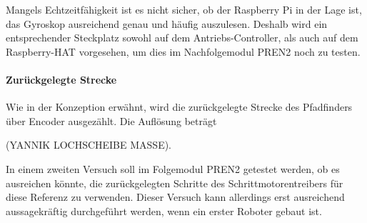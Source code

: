 \documentclass[main.tex]{subfiles} %
\begin{document}
Mangels Echtzeitfähigkeit ist es nicht sicher, ob der Raspberry Pi in der Lage
ist, das Gyroskop ausreichend genau und häufig auszulesen. Deshalb wird ein
entsprechender Steckplatz sowohl auf dem Antriebs-Controller, als auch auf dem
Raspberry-HAT vorgesehen, um dies im Nachfolgemodul PREN2 noch zu testen.

\paragraph{Zurückgelegte Strecke}
Wie in der Konzeption erwähnt, wird die zurückgelegte Strecke des Pfadfinders
über Encoder ausgezählt. Die Auflösung beträgt

(YANNIK LOCHSCHEIBE MASSE).

In einem zweiten Versuch soll im Folgemodul PREN2 getestet werden, ob es
ausreichen könnte, die zurückgelegten Schritte des Schrittmotorentreibers für
diese Referenz zu verwenden. Dieser Versuch kann allerdings erst ausreichend
aussagekräftig durchgeführt werden, wenn ein erster Roboter gebaut ist.
\end{document}
